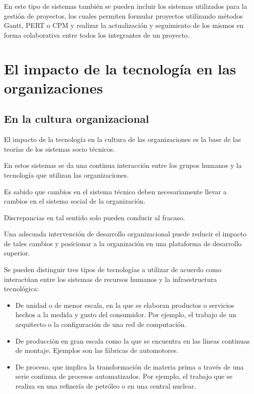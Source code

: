 \documentclass[a4paper, 12pt]{article}
\begin{document}
En este tipo de sistemas también se pueden incluir los sistemas utilizados para la gestión de proyectos, los cuales permiten formular proyectos utilizando métodos Gantt, PERT o CPM y realizar la actualización y seguimiento de los mismos en forma colaborativa entre todos los integrantes de un proyecto.

\section{El impacto de la tecnología en las organizaciones}
\subsection{En la cultura organizacional}

El impacto de la tecnología en la cultura de las organizaciones es la base de las teorías de los sistemas socio técnicos. 

En estos sistemas se da una continua interacción entre los grupos humanos y la tecnología que utilizan las organizaciones. 

Es sabido que cambios en el sistema técnico deben necesariamente llevar a cambios en el sistema social de la organización. 

Discrepancias en tal sentido solo pueden conducir al fracaso. 

Una adecuada intervención de desarrollo organizacional puede reducir el impacto de tales cambios y posicionar a la organización en una plataforma de desarrollo superior.

Se pueden distinguir tres tipos de tecnologías a utilizar de acuerdo como interactúan entre los sistemas de recursos humanos y la infraestructura tecnológica:


\begin{itemize}
\item De unidad o de menor escala, en la que se elaboran productos o servicios hechos a la medida y gusto del consumidor. Por ejemplo, el trabajo de un arquitecto o la configuración de una red de computación.
\item De producción en gran escala como la que se encuentra en las líneas continuas de montaje. Ejemplos son las fábricas de automotores.
\item De proceso, que implica la transformación de materia prima a través de una serie continua de procesos automatizados. Por ejemplo, el trabajo que se realiza en una refinería de petróleo o en una central nuclear.
\end{itemize}
\end{document}
